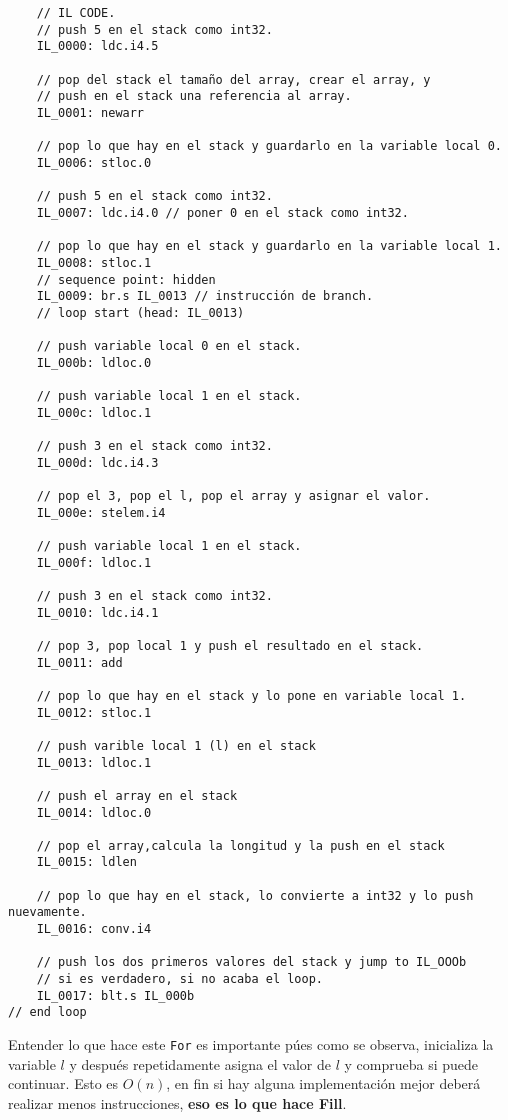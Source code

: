 \documentclass[14pt]{extarticle}
\begin{document}
\begin{verbatim}
    // IL CODE.
    // push 5 en el stack como int32.
    IL_0000: ldc.i4.5

    // pop del stack el tamaño del array, crear el array, y 
    // push en el stack una referencia al array.
    IL_0001: newarr 

    // pop lo que hay en el stack y guardarlo en la variable local 0.
    IL_0006: stloc.0

    // push 5 en el stack como int32.
    IL_0007: ldc.i4.0 // poner 0 en el stack como int32.

    // pop lo que hay en el stack y guardarlo en la variable local 1.
    IL_0008: stloc.1 
    // sequence point: hidden
    IL_0009: br.s IL_0013 // instrucción de branch.
    // loop start (head: IL_0013)
    
    // push variable local 0 en el stack.
    IL_000b: ldloc.0 

    // push variable local 1 en el stack.
    IL_000c: ldloc.1

    // push 3 en el stack como int32.
    IL_000d: ldc.i4.3

    // pop el 3, pop el l, pop el array y asignar el valor.
    IL_000e: stelem.i4

    // push variable local 1 en el stack.
    IL_000f: ldloc.1

    // push 3 en el stack como int32.
    IL_0010: ldc.i4.1
    
    // pop 3, pop local 1 y push el resultado en el stack.
    IL_0011: add
    
    // pop lo que hay en el stack y lo pone en variable local 1.
    IL_0012: stloc.1

    // push varible local 1 (l) en el stack
    IL_0013: ldloc.1
    
    // push el array en el stack
    IL_0014: ldloc.0
    
    // pop el array,calcula la longitud y la push en el stack
    IL_0015: ldlen
    
    // pop lo que hay en el stack, lo convierte a int32 y lo push nuevamente.
    IL_0016: conv.i4
    
    // push los dos primeros valores del stack y jump to IL_OOOb
    // si es verdadero, si no acaba el loop.
    IL_0017: blt.s IL_000b
// end loop
\end{verbatim}


Entender lo que hace este \texttt{For} es importante púes como se observa, inicializa la variable $l$ y después repetidamente asigna el valor de $l$ y comprueba si puede continuar. Esto es $O(n)$, en fin si hay alguna implementación mejor deberá realizar menos instrucciones, \textbf{eso es lo que hace Fill}. 
\end{document}
